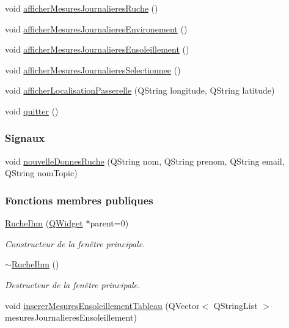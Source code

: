\begin{DoxyCompactItemize}
\item 
void \hyperlink{class_ruche_ihm_a94bd98327a73a15aad1306fc31f53ce8}{afficher\+Mesures\+Journalieres\+Ruche} ()
\item 
void \hyperlink{class_ruche_ihm_a5ee5942435915ca134765f42ff4b9061}{afficher\+Mesures\+Journalieres\+Environement} ()
\item 
void \hyperlink{class_ruche_ihm_abc250d15e6782c522b3d6676e0ee032d}{afficher\+Mesures\+Journalieres\+Ensoleillement} ()
\item 
void \hyperlink{class_ruche_ihm_a7f66af552d9e7ba0d00437ff3b330706}{afficher\+Mesures\+Journalieres\+Selectionnee} ()
\item 
void \hyperlink{class_ruche_ihm_a47770b4dcfdaad34c66f6a8a5224a648}{afficher\+Localisation\+Passerelle} (Q\+String longitude, Q\+String latitude)
\item 
void \hyperlink{class_ruche_ihm_a382502aff2ab21abf60f05bf573477fd}{quitter} ()
\end{DoxyCompactItemize}
\subsubsection*{Signaux}
\begin{DoxyCompactItemize}
\item 
void \hyperlink{class_ruche_ihm_afd6ed2087307a9f8fc75ac1e7bcd8b22}{nouvelle\+Donnes\+Ruche} (Q\+String nom, Q\+String prenom, Q\+String email, Q\+String nom\+Topic)
\end{DoxyCompactItemize}
\subsubsection*{Fonctions membres publiques}
\begin{DoxyCompactItemize}
\item 
\hyperlink{class_ruche_ihm_a04c2544ba4e9cca6c38f553c32d63dee}{Ruche\+Ihm} (\hyperlink{class_q_widget}{Q\+Widget} $\ast$parent=0)
\begin{DoxyCompactList}\small\item\em Constructeur de la fenêtre principale. \end{DoxyCompactList}\item 
\hyperlink{class_ruche_ihm_a4c489bf18e8c9947a375322d03504419}{$\sim$\+Ruche\+Ihm} ()
\begin{DoxyCompactList}\small\item\em Destructeur de la fenêtre principale. \end{DoxyCompactList}\item 
void \hyperlink{class_ruche_ihm_a6830ca55859cc2899ae8eb51b112557b}{inserer\+Mesures\+Ensoleillement\+Tableau} (Q\+Vector$<$ Q\+String\+List $>$ mesures\+Journalieres\+Ensoleillement)
\end{DoxyCompactItemize}
